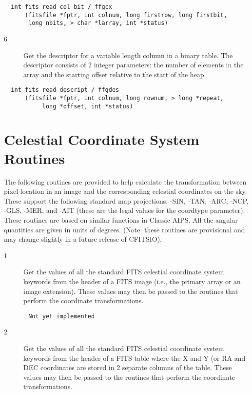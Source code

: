 \begin{verbatim}
  int fits_read_col_bit / ffgcx
      (fitsfile *fptr, int colnum, long firstrow, long firstbit,
       long nbits, > char *larray, int *status)
\end{verbatim}

\begin{description}
\item[6 ] Get the descriptor for a variable length column in a binary table.
    The descriptor consists of 2 integer parameters: the number of elements
   in the array and the starting offset relative to the start of the heap.
\end{description}

\begin{verbatim}
  int fits_read_descript / ffgdes
      (fitsfile *fptr, int colnum, long rownum, > long *repeat,
           long *offset, int *status)
\end{verbatim}


\section{Celestial Coordinate System Routines \label{FFGICS}}

The following routines are provided to help calculate the
transformation between pixel location in an image and the corresponding
celestial coordinates on the sky.  These support the following standard
map projections:  -SIN, -TAN, -ARC, -NCP, -GLS, -MER, and -AIT (these
are the legal values for the coordtype parameter).  These routines are
based on similar functions in Classic AIPS.  All the angular quantities
are given in units of degrees. (Note: these routines are provisional
and may change slightly in a future release of CFITSIO).


\begin{description}
\item[1 ] Get the values of all the standard FITS celestial coordinate system
    keywords from the header of a FITS image (i.e., the primary array or
    an image extension).  These values may then be passed to the routines
   that perform the coordinate transformations.
\end{description}

\begin{verbatim}
       Not yet implemented
\end{verbatim}

\begin{description}
\item[2 ] Get the values of all the standard FITS celestial coordinate system
    keywords from the header of a FITS table where the X and Y (or RA and
    DEC coordinates are stored in 2 separate columns of the table.
    These values may then be passed to the routines that perform the
   coordinate transformations.
\end{description}

